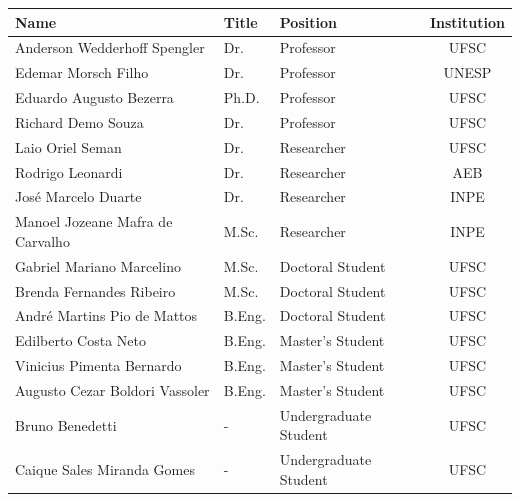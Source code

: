 \begin{table}[!htb]
    \centering
    \begin{tabular}{lllc}
        \toprule[1.5pt]
        \textbf{Name} & \textbf{Title} & \textbf{Position} & \textbf{Institution} \\
        \midrule
        Anderson Wedderhoff Spengler        & Dr.       & Professor             & UFSC \\
        Edemar Morsch Filho                 & Dr.       & Professor             & UNESP \\
        Eduardo Augusto Bezerra             & Ph.D.     & Professor             & UFSC \\
        Richard Demo Souza                  & Dr.       & Professor             & UFSC \\
        Laio Oriel Seman                    & Dr.       & Researcher            & UFSC \\
        Rodrigo Leonardi                    & Dr.       & Researcher            & AEB \\
        José Marcelo Duarte                 & Dr.       & Researcher            & INPE \\
        Manoel Jozeane Mafra de Carvalho    & M.Sc.     & Researcher            & INPE \\
        Gabriel Mariano Marcelino           & M.Sc.     & Doctoral Student      & UFSC \\
        Brenda Fernandes Ribeiro            & M.Sc.     & Doctoral Student      & UFSC \\
        André Martins Pio de Mattos         & B.Eng.    & Doctoral Student      & UFSC \\
        Edilberto Costa Neto                & B.Eng.    & Master's Student      & UFSC \\
        Vinicius Pimenta Bernardo           & B.Eng.    & Master's Student      & UFSC \\
        Augusto Cezar Boldori Vassoler      & B.Eng.    & Master's Student      & UFSC \\
        Bruno Benedetti                     & -         & Undergraduate Student & UFSC \\
        Caique Sales Miranda Gomes          & -         & Undergraduate Student & UFSC \\

\end{tabular}
\end{table}
